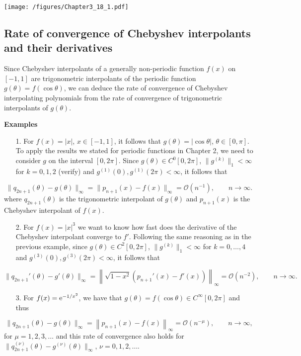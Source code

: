 \documentclass[12pt,a4paper]{article}
\begin{document}
\texttt{[image: /figures/Chapter3\_18\_1.pdf]}

\subsection{Rate of convergence of Chebyshev interpolants and their derivatives}
Since Chebyshev interpolants of a generally non-periodic function $f(x)$ on $[-1, 1]$ are trigonometric interpolants of the periodic function $g(\theta) = f(\cos\theta)$, we can deduce the rate of convergence of Chebyshev interpolating polynomials from the rate of convergence of trigonometric interpolants of $g(\theta)$.

\textbf{Examples}

\begin{itemize}
\item[1. ] For $f(x) = \vert x \vert$, $x \in [-1, 1]$, it follows that $g(\theta) = \vert \cos\theta \vert$, $\theta \in [0, \pi]$.  To apply the results we stated for periodic functions in Chapter 2, we need to consider $g$ on the interval $[0, 2\pi]$.  Since $g(\theta) \in C^{0}[0, 2\pi]$, $\| g^{(k)}\|_1 < \infty$ for $k = 0, 1, 2$ (verify) and $g^{(1)}(0), g^{(1)}(2\pi) < \infty$, it follows that

\end{itemize}
\[
\| q_{2n+1}(\theta) - g(\theta) \|_{\infty} = \| p_{n+1}(x) - f(x) \|_{\infty} = \mathcal{O}\left( n^{-1} \right), \qquad n \to \infty.
\]
where $q_{2n+1}(\theta)$ is the trigonometric interpolant of $g(\theta)$ and $p_{n+1}(x)$ is the Chebyshev interpolant of $f(x)$.

\begin{itemize}
\item[2. ] For $f(x) = \vert x \vert^3$ we want to know how fast does the derivative of the Chebyshev interpolant converge to $f'$.  Following the same reasoning as in the previous example, since $g(\theta) \in C^{2}[0, 2\pi]$, $\| g^{(k)}\|_1 < \infty$ for $k = 0, \ldots, 4$ and $g^{(3)}(0), g^{(3)}(2\pi) < \infty$, it follows that

\end{itemize}
\[
\| q_{2n+1}'(\theta) - g'(\theta) \|_{\infty} = \left\|\sqrt{1-x^2}( p_{n+1}'(x) - f'(x)) \right\|_{\infty} = \mathcal{O}\left( n^{-2} \right), \qquad n \to \infty.
\]
\begin{itemize}
\item[3. ] For $f(x) = {\rm e}^{-1/x^2}$, we have that $g(\theta) = f(\cos\theta) \in C^{\infty}[0, 2\pi]$ and thus

\end{itemize}
\[
\| q_{2n+1}(\theta) - g(\theta) \|_{\infty} = \left\| p_{n+1}(x) - f(x) \right\|_{\infty} = \mathcal{O}\left( n^{-\mu} \right), \qquad n \to \infty, 
\]
for $\mu = 1, 2, 3, \ldots$ and this rate of convergence also holds for $\| q_{2n+1}^{(\nu)}(\theta) - g^{(\nu)}(\theta) \|_{\infty}$, $\nu = 0, 1, 2, \ldots$.
\end{document}
